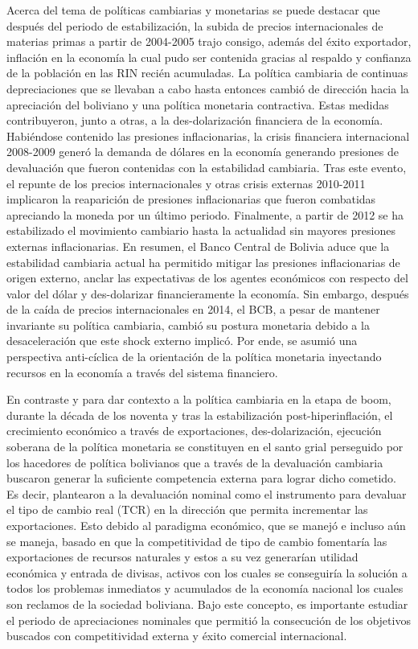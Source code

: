 \documentclass[12pt,letterpaper]{article}
\begin{document}
Acerca del tema de políticas cambiarias y monetarias se puede destacar que después del periodo de estabilización, la subida de precios internacionales de materias primas a partir de 2004-2005 trajo consigo, además del éxito exportador, inflación en la economía la cual pudo ser contenida gracias al respaldo y confianza de la población en las RIN recién acumuladas. La política cambiaria de continuas depreciaciones que se llevaban a cabo hasta entonces cambió de dirección hacia la apreciación del boliviano y una política monetaria contractiva. Estas medidas contribuyeron, junto a otras, a la des-dolarización financiera de la economía. Habiéndose contenido las presiones inflacionarias, la crisis financiera internacional 2008-2009 generó la demanda de dólares en la economía generando presiones de devaluación que fueron contenidas con la estabilidad cambiaria. Tras este evento, el repunte de los precios internacionales y otras crisis externas 2010-2011 implicaron la reaparición de presiones inflacionarias que fueron combatidas apreciando la moneda por un último periodo. Finalmente, a partir de 2012 se ha estabilizado el movimiento cambiario hasta la actualidad sin mayores presiones externas inflacionarias. En resumen, el Banco Central de Bolivia aduce que la estabilidad cambiaria actual ha permitido mitigar las presiones inflacionarias de origen externo, anclar las expectativas de los agentes económicos con respecto del valor del dólar y des-dolarizar financieramente la economía. Sin embargo, después de la caída de precios internacionales en 2014, el BCB, a pesar de mantener invariante su política cambiaria, cambió su postura monetaria debido a la desaceleración que este shock externo implicó. Por ende, se asumió una perspectiva anti-cíclica de la orientación de la política monetaria inyectando recursos en la economía a través del sistema financiero.

En contraste y para dar contexto a la política cambiaria en la etapa de boom, durante la década de los noventa y tras la estabilización post-hiperinflación, el crecimiento económico a través de exportaciones, des-dolarización, ejecución soberana de la política monetaria se constituyen en el santo grial perseguido por los hacedores de política bolivianos que a través de la devaluación cambiaria buscaron generar la suficiente competencia externa para lograr dicho cometido. Es decir, plantearon a la devaluación nominal como el instrumento para devaluar el tipo de cambio real (TCR) en la dirección que permita incrementar las exportaciones. Esto debido al paradigma económico, que se manejó e incluso aún se maneja, basado en que la competitividad de tipo de cambio fomentaría las exportaciones de recursos naturales y estos a su vez generarían utilidad económica y entrada de divisas, activos con los cuales se conseguiría la solución a todos los problemas inmediatos y acumulados de la economía nacional los cuales son reclamos de la sociedad boliviana. Bajo este concepto, es importante estudiar el periodo de apreciaciones nominales que permitió la consecución de los objetivos buscados con competitividad externa y éxito comercial internacional.
\end{document}
